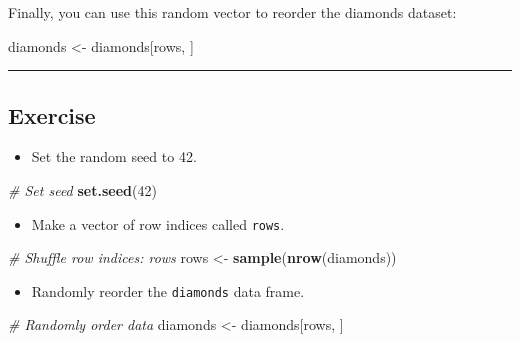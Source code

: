 \documentclass[]{book}
\newenvironment{Shaded}{\begin{snugshade}}{\end{snugshade}}
\newcommand{\KeywordTok}[1]{\textcolor[rgb]{0.13,0.29,0.53}{\textbf{#1}}}
\newcommand{\DecValTok}[1]{\textcolor[rgb]{0.00,0.00,0.81}{#1}}
\newcommand{\StringTok}[1]{\textcolor[rgb]{0.31,0.60,0.02}{#1}}
\newcommand{\CommentTok}[1]{\textcolor[rgb]{0.56,0.35,0.01}{\textit{#1}}}
\newcommand{\NormalTok}[1]{#1}
\providecommand{\tightlist}{%
  \setlength{\itemsep}{0pt}\setlength{\parskip}{0pt}}
\begin{document}
Finally, you can use this random vector to reorder the diamonds dataset:

\begin{Shaded}
\begin{Highlighting}[]
\NormalTok{diamonds <-}\StringTok{ }\NormalTok{diamonds[rows, ]}
\end{Highlighting}
\end{Shaded}

\begin{center}\rule{0.5\linewidth}{\linethickness}\end{center}

\subsection*{Exercise}\label{exercise-1}

\begin{itemize}
\tightlist
\item
  Set the random seed to 42.
\end{itemize}

\begin{Shaded}
\begin{Highlighting}[]
\CommentTok{# Set seed}
\KeywordTok{set.seed}\NormalTok{(}\DecValTok{42}\NormalTok{)}
\end{Highlighting}
\end{Shaded}

\begin{itemize}
\tightlist
\item
  Make a vector of row indices called \texttt{rows}.
\end{itemize}

\begin{Shaded}
\begin{Highlighting}[]
\CommentTok{# Shuffle row indices: rows}
\NormalTok{rows <-}\StringTok{ }\KeywordTok{sample}\NormalTok{(}\KeywordTok{nrow}\NormalTok{(diamonds))}
\end{Highlighting}
\end{Shaded}

\begin{itemize}
\tightlist
\item
  Randomly reorder the \texttt{diamonds} data frame.
\end{itemize}

\begin{Shaded}
\begin{Highlighting}[]
\CommentTok{# Randomly order data}
\NormalTok{diamonds <-}\StringTok{ }\NormalTok{diamonds[rows, ]}
\end{Highlighting}
\end{Shaded}
\end{document}
